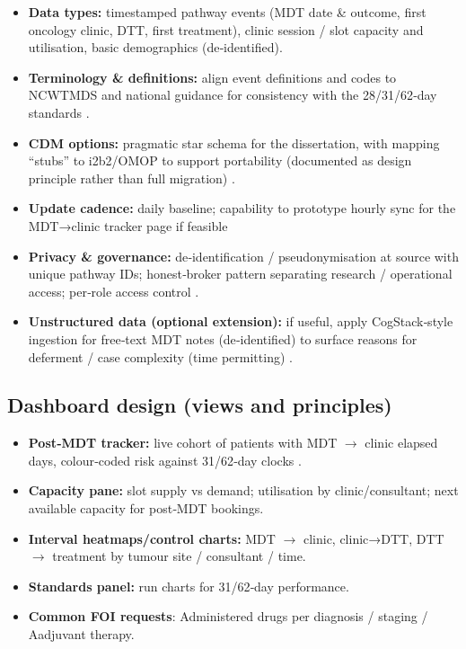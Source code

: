 \documentclass[12pt, a4paper, twoside]{article} %
\begin{document}
\begin{itemize}
  \item \textbf{Data types:} timestamped pathway events (MDT date \& outcome, first oncology clinic, DTT, first treatment), clinic session / slot capacity and utilisation, basic demographics (de‑identified).
\item \textbf{Terminology \& definitions:} align event definitions and codes to NCWTMDS and national guidance for consistency with the 28/31/62‑day standards \citep{NHSDigital2026}.
\item \textbf{CDM options:} pragmatic star schema for the dissertation, with mapping “stubs” to i2b2/OMOP to support portability (documented as design principle rather than full migration) \citep{gagalova2020}.
\item \textbf{Update cadence:} daily baseline; capability to prototype hourly sync for the MDT→clinic tracker page if feasible \citep{gagalova2020}
\item \textbf{Privacy \& governance:} de‑identification / pseudonymisation at source with unique pathway IDs; honest‑broker pattern separating research / operational access; per‑role access control \citep{gagalova2020}.
\item \textbf{Unstructured data (optional extension):} if useful, apply CogStack‑style ingestion for free‑text MDT notes (de‑identified) to surface reasons for deferment / case complexity (time permitting) \citep{jackson2018}.
\end{itemize}

\subsection{Dashboard design (views and principles)}

\begin{itemize}
\item \textbf{Post‑MDT tracker:} live cohort of patients with MDT $\rightarrow$ clinic elapsed days, colour‑coded risk against 31/62‑day clocks \citep{johnson2024}.
\item \textbf{Capacity pane:} slot supply vs demand; utilisation by clinic/consultant; next available capacity for post‑MDT bookings.
\item \textbf{Interval heatmaps/control charts:} MDT $\rightarrow$ clinic, clinic→DTT, DTT $\rightarrow$ treatment by tumour site / consultant / time.
\item \textbf{Standards panel:} run charts for 31/62‑day performance.  
\item \textbf{Common FOI requests}: Administered drugs per diagnosis / staging / Aadjuvant therapy.
\end{itemize}
\end{document}
